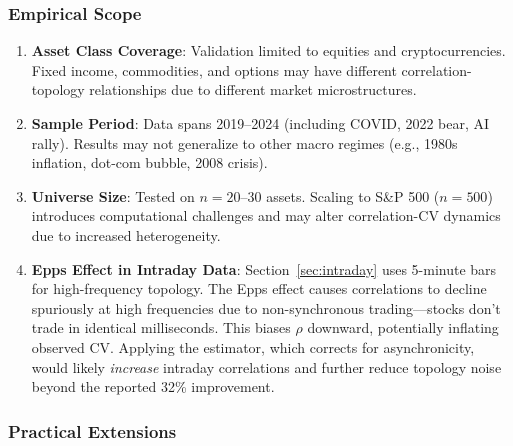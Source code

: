 \subsubsection{Empirical Scope}

\begin{enumerate}
\item \textbf{Asset Class Coverage}: Validation limited to equities and cryptocurrencies. Fixed income, commodities, and options may have different correlation-topology relationships due to different market microstructures.

\item \textbf{Sample Period}: Data spans 2019--2024 (including COVID, 2022 bear, AI rally). Results may not generalize to other macro regimes (e.g., 1980s inflation, dot-com bubble, 2008 crisis).

\item \textbf{Universe Size}: Tested on $n = 20$--30 assets. Scaling to S\&P 500 ($n = 500$) introduces computational challenges and may alter correlation-CV dynamics due to increased heterogeneity.

\item \textbf{Epps Effect in Intraday Data}: Section~\ref{sec:intraday} uses 5-minute bars for high-frequency topology. The Epps effect \citep{Epps1979} causes correlations to decline spuriously at high frequencies due to non-synchronous trading---stocks don't trade in identical milliseconds. This biases $\rho$ downward, potentially inflating observed CV. Applying the \citet{HayashiYoshida2005} estimator, which corrects for asynchronicity, would likely \textit{increase} intraday correlations and further reduce topology noise beyond the reported 32\% improvement.
\end{enumerate}

\subsubsection{Practical Extensions}

